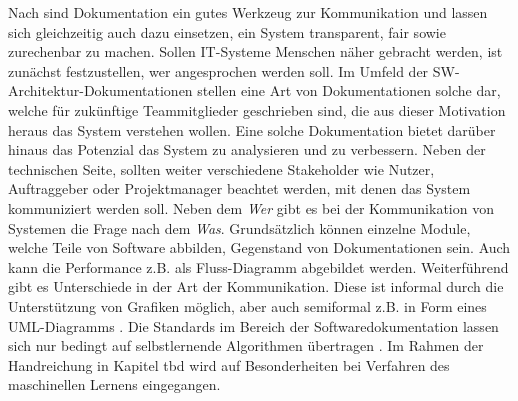 Nach \cite{konigstorfer2021software} sind Dokumentation ein gutes Werkzeug zur Kommunikation und lassen sich gleichzeitig auch dazu einsetzen, ein System transparent, fair sowie zurechenbar zu machen. Sollen IT-Systeme Menschen näher gebracht werden, ist zunächst festzustellen, wer angesprochen werden soll. Im Umfeld der SW-Architektur-Dokumentationen stellen eine Art von Dokumentationen solche dar, welche für zukünftige Teammitglieder geschrieben sind, die aus dieser Motivation heraus das System verstehen wollen. Eine solche Dokumentation bietet darüber hinaus das Potenzial das System zu analysieren und zu verbessern. Neben der technischen Seite, sollten weiter verschiedene Stakeholder wie Nutzer, Auftraggeber oder Projektmanager beachtet werden, mit denen das System kommuniziert werden soll. Neben dem \emph{Wer} gibt es bei der Kommunikation von Systemen die Frage nach dem \emph{Was}. Grundsätzlich können einzelne Module, welche Teile von Software abbilden, Gegenstand von Dokumentationen sein. Auch kann die Performance z.B. als Fluss-Diagramm abgebildet werden. Weiterführend gibt es Unterschiede in der Art der Kommunikation. Diese ist informal durch die Unterstützung von Grafiken möglich, aber auch semiformal z.B. in Form eines UML-Diagramms \cite{bass2003software}. Die Standards im Bereich der Softwaredokumentation lassen sich nur bedingt auf selbstlernende Algorithmen übertragen \cite{rodvold1999software}. Im Rahmen der Handreichung in Kapitel tbd wird auf Besonderheiten bei Verfahren des maschinellen Lernens eingegangen.
